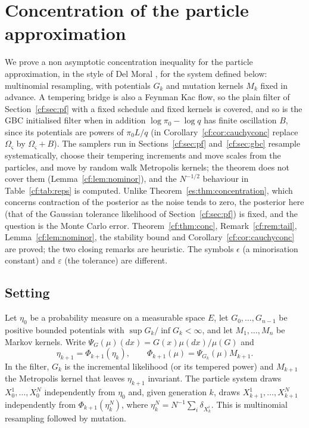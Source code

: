 \section{Concentration of the particle approximation}\label{cf:sec:conc}

We prove a non asymptotic concentration inequality for the particle approximation, in the style of Del Moral \cite{DelMoral04}, for the system defined below: multinomial resampling, with potentials $G_k$ and mutation kernels $M_k$ fixed in advance. A tempering bridge is also a Feynman Kac flow, so the plain filter of Section~\ref{cf:sec:pf} with a fixed schedule and fixed kernels is covered, and so is the GBC initialised filter when in addition $\log\pi_0-\log q$ has finite oscillation $B$, since its potentials are powers of $\pi_0L/q$ (in Corollary~\ref{cf:cor:cauchyconc} replace $\Omega_\varsigma$ by $\Omega_\varsigma+B$). The samplers run in Sections~\ref{cf:sec:pf} and~\ref{cf:sec:gbc} resample systematically, choose their tempering increments and move scales from the particles, and move by random walk Metropolis kernels; the theorem does not cover them (Lemma~\ref{cf:lem:nominor}), and the $N^{-1/2}$ behaviour in Table~\ref{cf:tab:reps} is computed. Unlike Theorem~\ref{es:thm:concentration}, which concerns contraction of the posterior as the noise tends to zero, the posterior here (that of the Gaussian tolerance likelihood of Section~\ref{cf:sec:pf}) is fixed, and the question is the Monte Carlo error. Theorem~\ref{cf:thm:conc}, Remark~\ref{cf:rem:tail}, Lemma~\ref{cf:lem:nominor}, the stability bound and Corollary~\ref{cf:cor:cauchyconc} are proved; the two closing remarks are heuristic. The symbols $\epsilon$ (a minorisation constant) and $\varepsilon$ (the tolerance) are different.

\subsection{Setting}

Let $\eta_0$ be a probability measure on a measurable space $E$, let $G_0,\dots,G_{n-1}$ be positive bounded potentials with $\sup G_k/\inf G_k<\infty$, and let $M_1,\dots,M_n$ be Markov kernels. Write $\Psi_G(\mu)(dx)=G(x)\mu(dx)/\mu(G)$ and
\[
\eta_{k+1}=\Phi_{k+1}(\eta_k),\qquad \Phi_{k+1}(\mu)=\Psi_{G_k}(\mu)M_{k+1}.
\]
In the filter, $G_k$ is the incremental likelihood (or its tempered power) and $M_{k+1}$ the Metropolis kernel that leaves $\eta_{k+1}$ invariant. The particle system draws $X_0^1,\dots,X_0^N$ independently from $\eta_0$ and, given generation $k$, draws $X_{k+1}^1,\dots,X_{k+1}^N$ independently from $\Phi_{k+1}(\eta_k^N)$, where $\eta_k^N=N^{-1}\sum_i\delta_{X_k^i}$. This is multinomial resampling followed by mutation.

